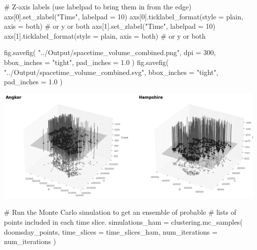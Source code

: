 \documentclass[
  11pt,
  letterpaper,
  DIV=11,
  numbers=noendperiod]{scrartcl}
\newenvironment{Shaded}{\begin{snugshade}}{\end{snugshade}}
\newcommand{\CommentTok}[1]{\textcolor[rgb]{0.37,0.37,0.37}{#1}}
\newcommand{\DecValTok}[1]{\textcolor[rgb]{0.68,0.00,0.00}{#1}}
\newcommand{\FloatTok}[1]{\textcolor[rgb]{0.68,0.00,0.00}{#1}}
\newcommand{\NormalTok}[1]{\textcolor[rgb]{0.00,0.23,0.31}{#1}}
\newcommand{\OperatorTok}[1]{\textcolor[rgb]{0.37,0.37,0.37}{#1}}
\newcommand{\StringTok}[1]{\textcolor[rgb]{0.13,0.47,0.30}{#1}}
\begin{document}
\begin{Shaded}
\begin{Highlighting}[]
\CommentTok{\# Z{-}axis labels (use labelpad to bring them in from the edge)}
\NormalTok{axs[}\DecValTok{0}\NormalTok{].set\_zlabel(}\StringTok{"Time"}\NormalTok{, labelpad }\OperatorTok{=} \DecValTok{10}\NormalTok{)}
\NormalTok{axs[}\DecValTok{0}\NormalTok{].ticklabel\_format(style }\OperatorTok{=} \StringTok{\textquotesingle{}plain\textquotesingle{}}\NormalTok{, axis }\OperatorTok{=} \StringTok{\textquotesingle{}both\textquotesingle{}}\NormalTok{)  }\CommentTok{\# or \textquotesingle{}y\textquotesingle{} or \textquotesingle{}both\textquotesingle{}}
\NormalTok{axs[}\DecValTok{1}\NormalTok{].set\_zlabel(}\StringTok{"Time"}\NormalTok{, labelpad }\OperatorTok{=} \DecValTok{10}\NormalTok{)}
\NormalTok{axs[}\DecValTok{1}\NormalTok{].ticklabel\_format(style }\OperatorTok{=} \StringTok{\textquotesingle{}plain\textquotesingle{}}\NormalTok{, axis }\OperatorTok{=} \StringTok{\textquotesingle{}both\textquotesingle{}}\NormalTok{)  }\CommentTok{\# or \textquotesingle{}y\textquotesingle{} or \textquotesingle{}both\textquotesingle{}}


\NormalTok{fig.savefig(}
    \StringTok{"../Output/spacetime\_volume\_combined.png"}\NormalTok{, }
\NormalTok{    dpi }\OperatorTok{=} \DecValTok{300}\NormalTok{, }
\NormalTok{    bbox\_inches }\OperatorTok{=} \StringTok{"tight"}\NormalTok{, }
\NormalTok{    pad\_inches }\OperatorTok{=} \FloatTok{1.0}
\NormalTok{)}
\NormalTok{fig.savefig(}
    \StringTok{"../Output/spacetime\_volume\_combined.svg"}\NormalTok{, }
\NormalTok{    bbox\_inches }\OperatorTok{=} \StringTok{"tight"}\NormalTok{, }
\NormalTok{    pad\_inches }\OperatorTok{=} \FloatTok{1.0}
\NormalTok{)}
\end{Highlighting}
\end{Shaded}

\includegraphics{analysis_files/figure-pdf/cell-24-output-1.png}

\begin{Shaded}
\begin{Highlighting}[]
\CommentTok{\# Run the Monte Carlo simulation to get an ensemble of probable }
\CommentTok{\# lists of points included in each time slice.}
\NormalTok{simulations\_ham }\OperatorTok{=}\NormalTok{ clustering.mc\_samples(}
\NormalTok{    doomsday\_points, }
\NormalTok{    time\_slices }\OperatorTok{=}\NormalTok{ time\_slices\_ham,  }
\NormalTok{    num\_iterations }\OperatorTok{=}\NormalTok{ num\_iterations}
\NormalTok{)}
\end{Highlighting}
\end{Shaded}
\end{document}
